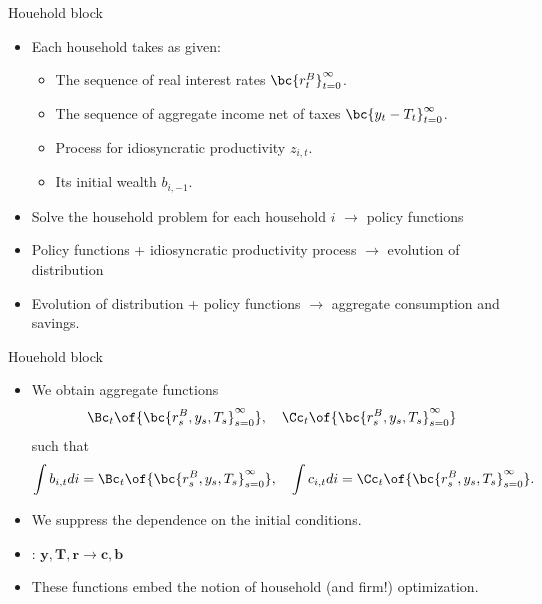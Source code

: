 \documentclass[11pt,xcolor={dvipsnames},aspectratio=159,hyperref={pdftex,pdfpagemode=UseNone,hidelinks,pdfdisplaydoctitle=true},usepdftitle=false]{beamer}
\begin{document}
\begin{frame}{Houehold block}
    \begin{itemize}
     \item Each household takes as given: \begin{itemize}
            \item The sequence of real interest rates $\bc{r^B_t}_{t=0}^\infty$.
            \item The sequence of aggregate income net of taxes $\bc{y_t - T_t}_{t=0}^\infty$.
            \item Process for idiosyncratic productivity $z_{i,t}$.
            \item Its initial wealth $b_{i,-1}$. \end{itemize}
     \item[1] Solve the household problem for each household $i$ $\rightarrow$ policy functions
     \item[2] Policy functions + idiosyncratic productivity process $\rightarrow$ evolution of distribution
     \item[3] Evolution of distribution + policy functions $\rightarrow$ aggregate consumption and savings.
    \end{itemize}
\end{frame}

\begin{frame}{Houehold block}
    \begin{itemize}
     \item We obtain aggregate functions \begin{align*}
        \Bc_t\of{\bc{r^B_s,y_s,T_s}_{s=0}^\infty}, \quad \Cc_t\of{\bc{r^B_s,y_s,T_s}_{s=0}^\infty} 
     \end{align*}
     such that \begin{align*}
        \int b_{i,t} di = \Bc_t\of{\bc{r^B_s,y_s,T_s}_{s=0}^\infty}, \quad \int c_{i,t} di = \Cc_t\of{\bc{r^B_s,y_s,T_s}_{s=0}^\infty}.
     \end{align*}
     \item We suppress the dependence on the initial conditions. 
     \item {}: $\bm{y,T,r} \rightarrow \bm{c,b}$
     \item These functions embed the notion of household (and firm!) optimization. 
    \end{itemize}
\end{frame}
\end{document}
